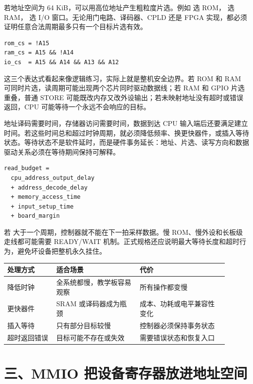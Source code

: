 若地址空间为 64 KiB，可以用高位地址产生粗粒度片选。例如  选 ROM， 选 RAM， 选 I/O 窗口。无论用门电路、译码器、CPLD 还是 FPGA 实现，都必须证明任意合法周期最多只有一个目标片选有效。

\begin{lstlisting}
rom_cs = !A15
ram_cs = A15 && !A14
io_cs  = A15 && A14 && A13 && A12
\end{lstlisting}

这三个表达式看起来像逻辑练习，实际上就是整机安全边界。若 ROM 和 RAM 可同时片选，读周期可能出现两个芯片同时驱动数据线；若 RAM 和 GPIO 片选重叠，普通 STORE 可能既改内存又改外设输出；若未映射地址没有超时或错误返回，CPU 可能等待一个永远不会响应的目标。

地址译码需要时间，存储器访问需要时间，数据到达 CPU 输入端后还要满足建立时间。若这些时间总和超过时钟周期，就必须降低频率、换更快器件，或插入等待状态。等待状态不是软件延时，而是硬件事务延长：地址、片选、读写方向和数据驱动关系必须在等待期间保持可解释。

\begin{lstlisting}
read_budget =
  cpu_address_output_delay
  + address_decode_delay
  + memory_access_time
  + input_setup_time
  + board_margin
\end{lstlisting}

若  大于一个周期，控制器就不能在下一拍采样数据。慢 ROM、慢外设和长板级走线都可能需要 READY/WAIT 机制。正式规格还应说明最大等待长度和超时行为，避免坏设备把整机永久挂住。

\begin{longtable}{L{0.2\linewidth}L{0.34\linewidth}L{0.36\linewidth}}
\toprule
处理方式 & 适合场景 & 代价 \\
\midrule
降低时钟 & 全系统都慢，教学板容易观察 & 所有操作都变慢 \\
更快器件 & SRAM 或译码器成为瓶颈 & 成本、功耗或电平兼容性变化 \\
插入等待 & 只有部分目标较慢 & 控制器必须保持事务状态 \\
超时返回错误 & 目标可能不存在或失效 & 需要错误状态和恢复入口 \\
\bottomrule
\end{longtable}

\section{三、MMIO 把设备寄存器放进地址空间}


